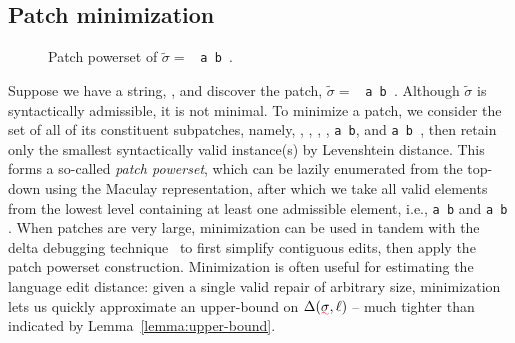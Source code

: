 \documentclass[sigplan,review,anonymous,acmsmall]{acmart}\settopmatter{printfolios=false,printccs=false,printacmref=false}
\begin{document}
\subsection{Patch minimization}\label{sec:minimization}

\begin{wrapfigure}{r}{0.4\textwidth}
  \vspace{-14pt}
  \caption{Patch powerset of $\tilde{\sigma}=$ \texttt{\hlgreen{(} a \hlorange{+} b \hlgreen{)}}.}
\end{wrapfigure}

Suppose we have a string, \texttt{}, and discover the patch, $\tilde{\sigma}=$ \texttt{\hlgreen{(} a \hlorange{+} b \hlgreen{)}}. Although $\tilde{\sigma}$ is syntactically admissible, it is not minimal. To minimize a patch, we consider the set of all of its constituent subpatches, namely, \texttt{}, \texttt{}, \texttt{}, \texttt{}, \texttt{a \hlorange{+} b}, and \texttt{a \hlgreen{(} b \hlgreen{)}}, then retain only the smallest syntactically valid instance(s) by Levenshtein distance. This forms a so-called \textit{patch powerset}, which can be lazily enumerated from the top-down using the Maculay representation, after which we take all valid elements from the lowest level containing at least one admissible element, i.e., \texttt{a \hlorange{+} b} and \texttt{a \hlgreen{(} b \hlgreen{)}}. When patches are very large, minimization can be used in tandem with the delta debugging technique~\cite{zeller2002isolating} to first simplify contiguous edits, then apply the patch powerset construction. Minimization is often useful for estimating the language edit distance: given a single valid repair of arbitrary size, minimization lets us quickly approximate an upper-bound on $\Delta(\err{\sigma}, \ell)$ -- much tighter than indicated by Lemma~\ref{lemma:upper-bound}.
\end{document}
